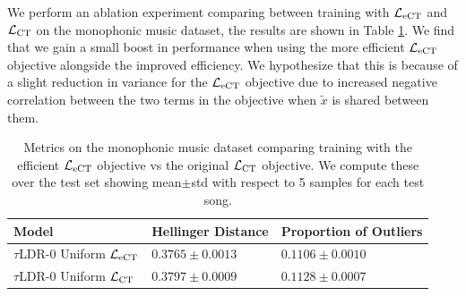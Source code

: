 \documentclass{article}
\begin{document}
We perform an ablation experiment comparing between training with $\mathcal{L}_{\textup{eCT}}$ and $\mathcal{L}_{\textup{CT}}$ on the monophonic music dataset, the results are shown in Table \ref{tab:apdx_two_forward_pass_ablation}. We find that we gain a small boost in performance when using the more efficient $\mathcal{L}_{\textup{eCT}}$ objective alongside the improved efficiency. We hypothesize that this is because of a slight reduction in variance for the $\mathcal{L}_{\textup{eCT}}$ objective due to increased negative correlation between the two terms in the objective when $\tilde{x}$ is shared between them.


\begin{table}
  \caption{Metrics on the monophonic music dataset comparing training with the efficient $\mathcal{L}_{\textup{eCT}}$ objective vs the original $\mathcal{L}_{\textup{CT}}$ objective. We compute these over the test set showing mean$\pm$std with respect to 5 samples for each test song.}
  \label{tab:apdx_two_forward_pass_ablation}
  \centering
  \begin{tabular}{lll}
    \toprule
    Model  & Hellinger Distance & Proportion of Outliers \\
    \midrule
    $\tau$LDR-0 Uniform $\mathcal{L}_{\textup{eCT}}$ & $0.3765 \pm 0.0013$ & $0.1106 \pm 0.0010$ \\
    $\tau$LDR-0 Uniform $\mathcal{L}_{\textup{CT}}$ & $0.3797 \pm 0.0009$ & $0.1128 \pm 0.0007$\\
    \bottomrule
  \end{tabular}
\end{table}
\end{document}

